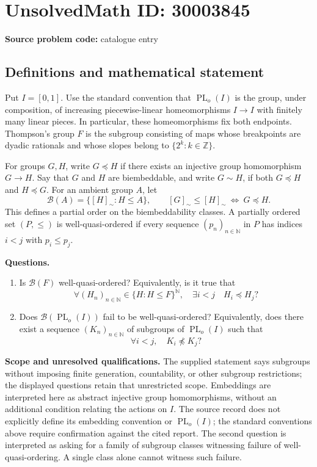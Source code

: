 \documentclass[11pt]{article}
\newcommand{\N}{\mathbb{N}}
\newcommand{\Z}{\mathbb{Z}}
\begin{document}
\section*{UnsolvedMath ID: 30003845}
\textbf{Source problem code:} catalogue entry
\subsection{Definitions and mathematical statement}
Put \(I=[0,1]\). Use the standard convention that \(\operatorname{PL}_o(I)\) is the group, under composition, of increasing piecewise-linear homeomorphisms \(I\to I\) with finitely many linear pieces. In particular, these homeomorphisms fix both endpoints. Thompson's group \(F\) is the subgroup consisting of maps whose breakpoints are dyadic rationals and whose slopes belong to \(\{2^k:k\in\Z\}\).

For groups \(G,H\), write \(G\preccurlyeq H\) if there exists an injective group homomorphism \(G\to H\). Say that \(G\) and \(H\) are biembeddable, and write \(G\sim H\), if both \(G\preccurlyeq H\) and \(H\preccurlyeq G\). For an ambient group \(A\), let
\[
\mathcal B(A)=\{[H]_{\sim}:H\leq A\},
\qquad
[G]_{\sim}\leq[H]_{\sim}\ \Longleftrightarrow\ G\preccurlyeq H.
\]
This defines a partial order on the biembeddability classes. A partially ordered set \((P,\leq)\) is well-quasi-ordered if every sequence \((p_n)_{n\in\N}\) in \(P\) has indices \(i<j\) with \(p_i\leq p_j\).

\textbf{Questions.}
\begin{enumerate}
\item Is \(\mathcal B(F)\) well-quasi-ordered? Equivalently, is it true that
\[
\forall (H_n)_{n\in\N}\in\{H:H\leq F\}^{\N},\quad
\exists i<j\quad H_i\preccurlyeq H_j?
\]
\item Does \(\mathcal B(\operatorname{PL}_o(I))\) fail to be well-quasi-ordered? Equivalently, does there exist a sequence \((K_n)_{n\in\N}\) of subgroups of \(\operatorname{PL}_o(I)\) such that
\[
\forall i<j,\quad K_i\not\preccurlyeq K_j?
\]
\end{enumerate}

\textbf{Scope and unresolved qualifications.} The supplied statement says subgroups without imposing finite generation, countability, or other subgroup restrictions; the displayed questions retain that unrestricted scope. Embeddings are interpreted here as abstract injective group homomorphisms, without an additional condition relating the actions on \(I\). The source record does not explicitly define its embedding convention or \(\operatorname{PL}_o(I)\); the standard conventions above require confirmation against the cited report. The second question is interpreted as asking for a family of subgroup classes witnessing failure of well-quasi-ordering. A single class alone cannot witness such failure.
\end{document}
